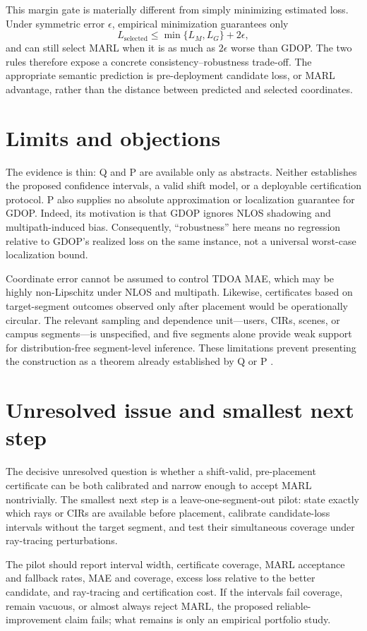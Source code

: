 \documentclass{article}
\begin{document}
This margin gate is materially different from simply minimizing estimated loss. Under symmetric error \(\epsilon\), empirical minimization guarantees only
\[
  L_{\mathrm{selected}}
  \leq \min\{L_M,L_G\}+2\epsilon,
\]
and can still select MARL when it is as much as \(2\epsilon\) worse than GDOP. The two rules therefore expose a concrete consistency--robustness trade-off. The appropriate semantic prediction is pre-deployment candidate loss, or MARL advantage, rather than the distance between predicted and selected coordinates.

\section{Limits and objections}

The evidence is thin: Q and P are available only as abstracts. Neither establishes the proposed confidence intervals, a valid shift model, or a deployable certification protocol. P also supplies no absolute approximation or localization guarantee for GDOP. Indeed, its motivation is that GDOP ignores NLOS shadowing and multipath-induced bias. Consequently, ``robustness'' here means no regression relative to GDOP's realized loss on the same instance, not a universal worst-case localization bound.

Coordinate error cannot be assumed to control TDOA MAE, which may be highly non-Lipschitz under NLOS and multipath. Likewise, certificates based on target-segment outcomes observed only after placement would be operationally circular. The relevant sampling and dependence unit---users, CIRs, scenes, or campus segments---is unspecified, and five segments alone provide weak support for distribution-free segment-level inference. These limitations prevent presenting the construction as a theorem already established by Q or P .

\section{Unresolved issue and smallest next step}

The decisive unresolved question is whether a shift-valid, pre-placement certificate can be both calibrated and narrow enough to accept MARL nontrivially. The smallest next step is a leave-one-segment-out pilot: state exactly which rays or CIRs are available before placement, calibrate candidate-loss intervals without the target segment, and test their simultaneous coverage under ray-tracing perturbations.

The pilot should report interval width, certificate coverage, MARL acceptance and fallback rates, MAE and coverage, excess loss relative to the better candidate, and ray-tracing and certification cost. If the intervals fail coverage, remain vacuous, or almost always reject MARL, the proposed reliable-improvement claim fails; what remains is only an empirical portfolio study.
\end{document}
